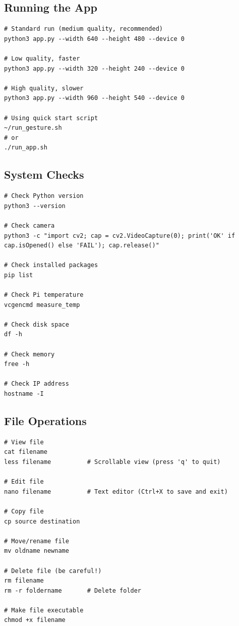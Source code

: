 \documentclass[12pt,a4paper]{article}
\begin{document}
\subsection{Running the App}

\begin{lstlisting}
# Standard run (medium quality, recommended)
python3 app.py --width 640 --height 480 --device 0

# Low quality, faster
python3 app.py --width 320 --height 240 --device 0

# High quality, slower
python3 app.py --width 960 --height 540 --device 0

# Using quick start script
~/run_gesture.sh
# or
./run_app.sh
\end{lstlisting}

\subsection{System Checks}

\begin{lstlisting}
# Check Python version
python3 --version

# Check camera
python3 -c "import cv2; cap = cv2.VideoCapture(0); print('OK' if cap.isOpened() else 'FAIL'); cap.release()"

# Check installed packages
pip list

# Check Pi temperature
vcgencmd measure_temp

# Check disk space
df -h

# Check memory
free -h

# Check IP address
hostname -I
\end{lstlisting}

\subsection{File Operations}

\begin{lstlisting}
# View file
cat filename
less filename          # Scrollable view (press 'q' to quit)

# Edit file
nano filename          # Text editor (Ctrl+X to save and exit)

# Copy file
cp source destination

# Move/rename file
mv oldname newname

# Delete file (be careful!)
rm filename
rm -r foldername       # Delete folder

# Make file executable
chmod +x filename
\end{lstlisting}
\end{document}
